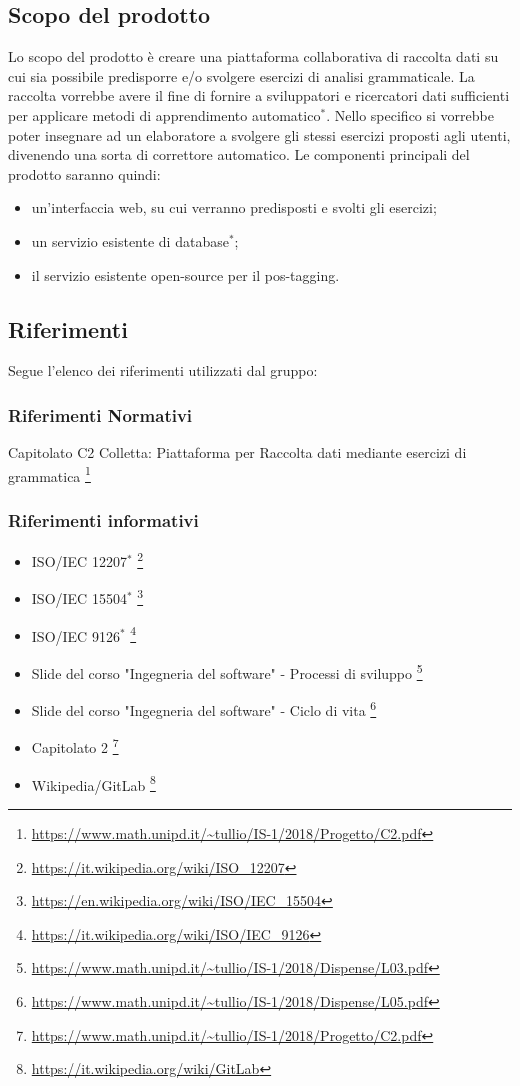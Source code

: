 \documentclass[11pt,a4paper]{article}
\begin{document}
{	\subsection{Scopo del prodotto}
	Lo scopo del prodotto è creare una piattaforma collaborativa di raccolta dati su cui sia possibile predisporre e/o svolgere esercizi di analisi grammaticale. La raccolta vorrebbe avere il fine di fornire a sviluppatori e ricercatori dati sufficienti per applicare metodi di apprendimento automatico$^*$. Nello specifico si vorrebbe poter insegnare ad un elaboratore a svolgere gli stessi esercizi proposti agli utenti, divenendo una sorta di correttore automatico.  
	Le componenti principali del prodotto saranno quindi:
	\begin{itemize}
		\item un'interfaccia web, su cui verranno predisposti e svolti gli esercizi;
		\item un servizio esistente di database$^*$;
		\item il servizio esistente open-source per il pos-tagging.
	\end{itemize}
	
	\subsection{Riferimenti}
	Segue l'elenco dei riferimenti utilizzati dal gruppo:
	\subsubsection{Riferimenti Normativi}
Capitolato C2 Colletta: Piattaforma per Raccolta dati mediante esercizi di grammatica
\footnote{\url{https://www.math.unipd.it/~tullio/IS-1/2018/Progetto/C2.pdf}}

	\subsubsection{Riferimenti informativi}
	\begin{itemize}
		\item ISO/IEC 12207$^*$
		\footnote{\url {https://it.wikipedia.org/wiki/ISO\_12207}}
		
		\item ISO/IEC 15504$^*$
		\footnote{\url {https://en.wikipedia.org/wiki/ISO/IEC\_15504}}
		\item ISO/IEC 9126$^*$
		\footnote{\url {https://it.wikipedia.org/wiki/ISO/IEC\_9126}}
		
	\item Slide del corso "Ingegneria del software" - Processi di sviluppo 
		\footnote{\url{https://www.math.unipd.it/~tullio/IS-1/2018/Dispense/L03.pdf}}
		\item Slide del corso "Ingegneria del software" - Ciclo di vita 
		\footnote{\url{https://www.math.unipd.it/~tullio/IS-1/2018/Dispense/L05.pdf}}
		\item Capitolato 2
		\footnote{\url{https://www.math.unipd.it/~tullio/IS-1/2018/Progetto/C2.pdf}}
		\item Wikipedia/GitLab
		\footnote{\url {https://it.wikipedia.org/wiki/GitLab}}
	\end{itemize}					
\newpage

}
\end{document}
